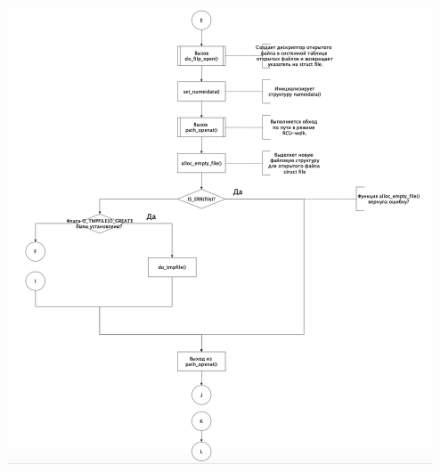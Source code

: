 \documentclass[a4paper,12pt]{article}
\begin{document}
	\begin{figure}[h!]
		\begin{center}
			{\includegraphics[scale = 0.8]{4.png}}
			\label{4}
		\end{center}
	\end{figure}
\end{document}
